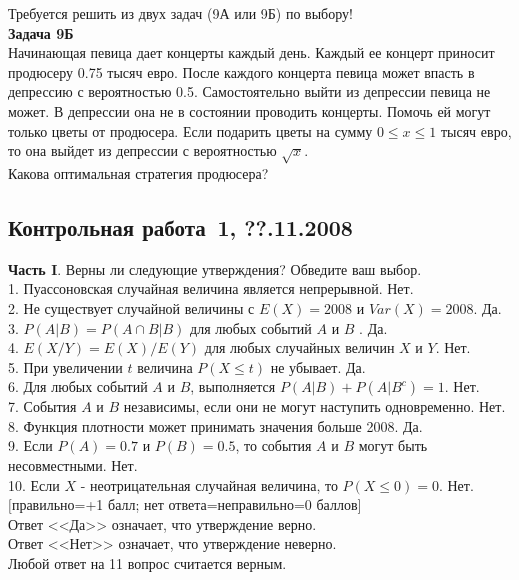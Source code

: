 \documentclass[pdftex,12pt,a4paper]{article}
\begin{document}
Требуется решить \textbf{} из двух задач (9А или 9Б) по
выбору! \\

\textbf{Задача 9Б} \\
Начинающая певица дает концерты каждый день. Каждый ее концерт приносит продюсеру 0.75 тысяч евро. После каждого концерта певица может впасть в депрессию с вероятностью 0.5. Самостоятельно выйти из депрессии певица не может. В депрессии она не в состоянии проводить концерты. Помочь ей могут только цветы от продюсера. Если подарить цветы на сумму $0\le x\le 1$ тысяч евро, то она выйдет из депрессии с вероятностью $\sqrt{x}$. \\
Какова оптимальная стратегия продюсера? \\


\subsection{Контрольная работа \No\,1, ??.11.2008}

\textbf{Часть I}. Верны ли следующие утверждения? Обведите ваш выбор. \\

1. Пуассоновская случайная величина является непрерывной. Нет. \\
2. Не существует случайной величины с $E(X)=2008$ и $Var(X)=2008$. Да. \\
3. $P(A|B)=P(A\cap B|B)$ для любых событий $A$ и $B$ . Да. \\
4. $E(X/Y)=E(X)/E(Y)$ для любых случайных величин $X$ и $Y$. Нет. \\
5. При увеличении $t$ величина $P(X\le t)$ не убывает. Да. \\
6. Для любых событий $A$ и $B$, выполняется $P(A|B)+P(A|B^{c})=1$. Нет. \\
7. События $A$ и $B$ независимы, если они не могут наступить одновременно. Нет. \\
8. Функция плотности может принимать значения больше 2008. Да. \\
9. Если $P(A)=0.7$ и $P(B)=0.5$, то события $A$ и $B$ могут быть несовместными. Нет. \\
10. Если $X$ - неотрицательная случайная величина, то $P(X\le 0)=0$. Нет. \\

$[$правильно=+1 балл; нет ответа=неправильно=0 баллов$]$ \\
Ответ <<Да>> означает, что утверждение верно. \\
Ответ <<Нет>> означает, что утверждение неверно. \\
Любой ответ на 11 вопрос считается верным. \\
\end{document}
